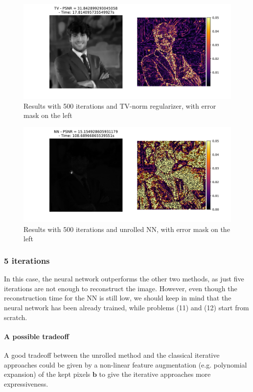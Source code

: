 \documentclass[12pt]{article}
\begin{document}
\begin{figure}[H]
    \centering
    \includegraphics[width=12cm]{hw3/codes/exercise2/results/comparisons/me_comparison_tv_500.pdf}
    \caption{Results with 500 iterations and TV-norm regularizer, with error mask on the left}
    \label{fig:comparison-tv-500}
\end{figure}

\begin{figure}[H]
    \centering
    \includegraphics[width=12cm]{hw3/codes/exercise2/results/comparisons/me_comparison_nn_500.pdf}
    \caption{Results with 500 iterations and unrolled NN, with error mask on the left}
    \label{fig:comparison-nn-500}
\end{figure}

\subsubsection{5 iterations}
In this case, the neural network outperforms the other two methods, as just five iterations are not enough to reconstruct the image. However, even though the reconstruction time for the NN is still low, we should keep in mind that the neural network has been already trained, while problems (11) and (12) start from scratch.

\paragraph{A possible tradeoff}
A good tradeoff between the unrolled method and the classical iterative approaches could be given by a non-linear feature augmentation (e.g. polynomial expansion) of the kept pixels $\mathbf{b}$ to give the iterative approaches more expressiveness.
\end{document}
